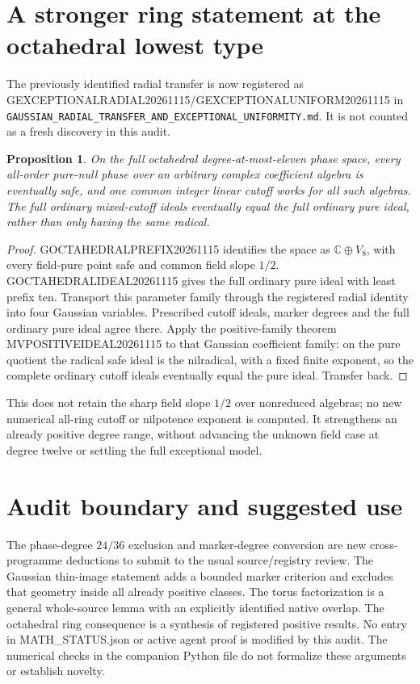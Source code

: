 \documentclass[11pt]{article}
\newtheorem{proposition}{Proposition}
\newcommand{\C}{\mathbb C}
\begin{document}
\section{A stronger ring statement at the octahedral lowest type}
The previously identified radial transfer is now registered as
GEXCEPTIONALRADIAL20261115/GEXCEPTIONALUNIFORM20261115 in
\texttt{GAUSSIAN\_RADIAL\_TRANSFER\_AND\_EXCEPTIONAL\_UNIFORMITY.md}.
It is not counted as a fresh discovery in this audit.

\begin{proposition}
On the full octahedral degree-at-most-eleven phase space, every all-order
pure-null phase over an arbitrary complex coefficient algebra is eventually
safe, and one common integer linear cutoff works for all such algebras.
The full ordinary mixed-cutoff ideals eventually equal the full ordinary
pure ideal, rather than only having the same radical.
\end{proposition}
\begin{proof}
GOCTAHEDRALPREFIX20261115 identifies the space as
$\C\oplus V_8$, with every field-pure point safe and common field slope
$1/2$. GOCTAHEDRALIDEAL20261115 gives the full ordinary pure ideal with
least prefix ten. Transport this parameter family through the registered
radial identity into four Gaussian variables. Prescribed cutoff ideals,
marker degrees and the full ordinary pure ideal agree there.
Apply the positive-family theorem MVPOSITIVEIDEAL20261115 to that
Gaussian coefficient family: on the pure quotient the radical safe ideal
is the nilradical, with a fixed finite exponent, so the complete ordinary
cutoff ideals eventually equal the pure ideal. Transfer back.
\end{proof}
This does not retain the sharp field slope $1/2$ over nonreduced algebras;
no new numerical all-ring cutoff or nilpotence exponent is computed.
It strengthens an already positive degree range, without advancing the
unknown field case at degree twelve or settling the full exceptional model.

\section{Audit boundary and suggested use}
The phase-degree $24/36$ exclusion and marker-degree conversion are new
cross-programme deductions to submit to the usual source/registry review.
The Gaussian thin-image statement adds a bounded marker criterion and
excludes that geometry inside all already positive classes. The torus
factorization is a general whole-source lemma with an explicitly identified
native overlap. The octahedral ring consequence is a synthesis of registered
positive results. No entry in MATH\_STATUS.json or active agent proof is
modified by this audit. The numerical checks in the companion Python file
do not formalize these arguments or establish novelty.
\end{document}
